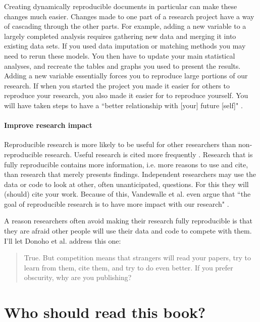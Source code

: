 Creating dynamically reproducible documents in particular can make these changes much easier. Changes made to one part of a research project have a way of cascading through the other parts. For example, adding a new variable to a largely completed analysis requires gathering new data and merging it into existing data sets. If you used data imputation or matching methods you may need to rerun these models. You then have to update your main statistical analyses, and recreate the tables and graphs you used to present the results. Adding a new variable essentially forces you to reproduce large portions of our research. If when you started the project you made it easier for others to reproduce your research, you also made it easier for to reproduce yourself. You will have taken steps to have a ``better relationship with [your] future [self]" \cite[]{Bowers2011}.

\paragraph{Improve research impact}
Reproducible research is more likely to be useful for other researchers than non-reproducible research. Useful research is cited more frequently \cite[]{Vandewalle2012}. Research that is fully reproducible contains more information, i.e. more reasons to use and cite, than research that merely presents findings. Independent researchers may use the data or code to look at other, often unanticipated, questions. For this they will (should) cite your work. Because of this, Vandewalle et al. even argue that ``the goal of reproducible research is to have more impact with our research"  \citeyearpar[1253]{Vandewalle2007}.


A reason researchers often avoid making their research fully reproducible is that they are afraid other people will use their data and code to compete with them. I'll let Donoho et al. address this one:

\begin{quote}
    True. But competition means that strangers will read your papers, try to learn from them, cite them, and try to do even better. If you prefer obscurity, why are you publishing? \citeyearpar[16]{Donoho2009}
\end{quote}

\section{Who should read this book?}

